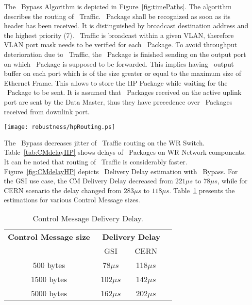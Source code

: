 The \HP\ Bypass Algorithm is depicted in Figure~\ref{fig:timePaths}. The
algorithm describes the routing of \HP\ Traffic. \HP\ Package shall be recognized as
soon as its header has been received. It is distinguished by broadcast
destination address and the highest priority (7). \HP\ Traffic is broadcast
within a given VLAN, therefore VLAN port mask needs to be verified for each \HP\
Package. To avoid throughput deterioration due to \HP\ Traffic, the \SP\ Package
is finished sending on the output port on which \HP\ Package is supposed
to be forwarded. This implies having \HP\ output buffer on each port which is
of the size greater or equal to the maximum size of Ethernet Frame. This allows
to store the HP Package while waiting for the \SP\ Package to be sent. It is assumed
that \HP\ Packages received on the active uplink port are sent by the Data
Master, thus they have precedence over \HP\ Packages received from downlink
port.
 
\begin{center}
	\texttt{[image: robustness/hpRouting.ps]}
	\label{fig:timePaths}
\end{center}


The \HP\ Bypass decreases jitter of \HP\ Traffic routing
on the WR Switch. Table~\ref{tab:CMdelayHP} shows delays of \HP\ Packages on WR
Network components. It can be noted that routing of \HP\ Traffic is considerably
faster. Figure~\ref{fig:CMdelayHP} depicts \ControlMessage\ Delivery Delay
estimation with \HP\ Bypass. For the GSI use case, the CM Delivery Delay
decreased from $221\mu s$ to $78\mu s$, while for CERN scenario the delay
changed from $283\mu s$ to $118\mu s$. Table~\ref{tab:CMspDelay} presents the
estimations for various Control Message sizes.

\begin{table}[ht]
\caption{Control Message Delivery Delay.} 
\centering
	\begin{tabular}{| c | c | c | c |}          \hline
\textbf{Control Message size}& \multicolumn{2}{|c|}{\textbf{\ControlMessage\
Delivery Delay}}\\
               &    GSI           & CERN          \\ \hline
500 bytes      & 78$\mu s$        & 118$\mu s$    \\ \hline
1500 bytes     & 102$\mu s$       & 142$\mu s$    \\ \hline
5000 bytes     & 162$\mu s$       & 202$\mu s$    \\ \hline
\end{tabular}
\label{tab:CMspDelay}
\end{table}


